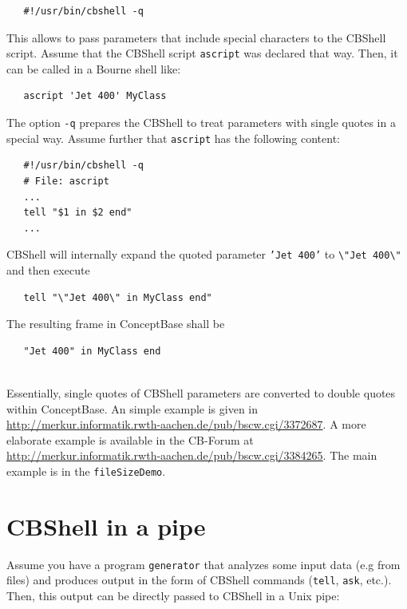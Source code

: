 \begin{verbatim}
   #!/usr/bin/cbshell -q
\end{verbatim}

This allows to pass parameters that include special characters
to the CBShell script. Assume  that the CBShell script {\tt ascript} was
declared that way. Then, it can be called in a Bourne shell like:

\begin{verbatim}
   ascript 'Jet 400' MyClass 
\end{verbatim}

The option {\tt -q}  prepares the CBShell to treat parameters with single quotes
in a special way. Assume further that {\tt ascript} has the following content:

\begin{verbatim}
   #!/usr/bin/cbshell -q
   # File: ascript
   ...
   tell "$1 in $2 end"
   ...
\end{verbatim}

CBShell will internally expand the quoted parameter {\tt 'Jet 400'} to
{\tt \textbackslash"Jet 400\textbackslash"} and then execute

\begin{verbatim}
   tell "\"Jet 400\" in MyClass end"
\end{verbatim}

The resulting frame in ConceptBase shall be

\begin{verbatim}
   "Jet 400" in MyClass end


\end{verbatim}

Essentially, single quotes of CBShell parameters are converted to double quotes within ConceptBase.
An simple example is given in
\url{http://merkur.informatik.rwth-aachen.de/pub/bscw.cgi/3372687}.
A more elaborate example is available in the CB-Forum at
\url{http://merkur.informatik.rwth-aachen.de/pub/bscw.cgi/3384265}.
The main example is in the {\tt fileSizeDemo}.


\section{CBShell in a pipe}
\label{sec:cbshellpipe}

Assume you have a program {\tt generator} that analyzes some input data (e.g from files) and
produces output in the form of CBShell commands ({\tt tell}, {\tt ask}, etc.). Then,
this output can be directly passed to CBShell in a Unix pipe:

